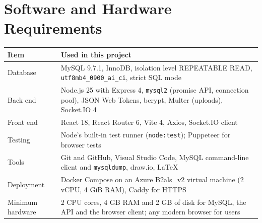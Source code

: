 \section{Software and Hardware Requirements}
\begin{tabularx}{\textwidth}{@{}lY@{}}
\toprule
\textbf{Item} & \textbf{Used in this project} \\\midrule
Database & MySQL 9.7.1, InnoDB, isolation level REPEATABLE READ, \texttt{utf8mb4\_0900\_ai\_ci}, strict SQL mode \\
Back end & Node.js 25 with Express 4, \texttt{mysql2} (promise API, connection pool), JSON Web Tokens, bcrypt, Multer (uploads), Socket.IO 4 \\
Front end & React 18, React Router 6, Vite 4, Axios, Socket.IO client \\
Testing & Node's built-in test runner (\texttt{node:test}); Puppeteer for browser tests \\
Tools & Git and GitHub, Visual Studio Code, MySQL command-line client and \texttt{mysqldump}, draw.io, \LaTeX{} \\
Deployment & Docker Compose on an Azure B2als\_v2 virtual machine (2 vCPU, 4 GiB RAM), Caddy for HTTPS \\
Minimum hardware & 2 CPU cores, 4 GB RAM and 2 GB of disk for MySQL, the API and the browser client; any modern browser for users \\
\bottomrule
\end{tabularx}
